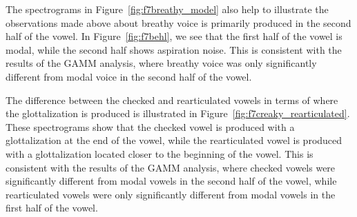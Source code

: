 The spectrograms in Figure~\ref{fig:f7breathy_model} also help to illustrate the observations made above about breathy voice is primarily produced in the second half of the vowel. In Figure~\ref{fig:f7behl}, we see that the first half of the vowel is modal, while the second half shows aspiration noise. This is consistent with the results of the GAMM analysis, where breathy voice was only significantly different from modal voice in the second half of the vowel.

The difference between the checked and rearticulated vowels in terms of where the glottalization is produced is illustrated in Figure~\ref{fig:f7creaky_rearticulated}. These spectrograms show that the checked vowel is produced with a glottalization at the end of the vowel, while the rearticulated vowel is produced with a glottalization located closer to the beginning of the vowel. This is consistent with the results of the GAMM analysis, where checked vowels were significantly different from modal vowels in the second half of the vowel, while rearticulated vowels were only significantly different from modal vowels in the first half of the vowel.

